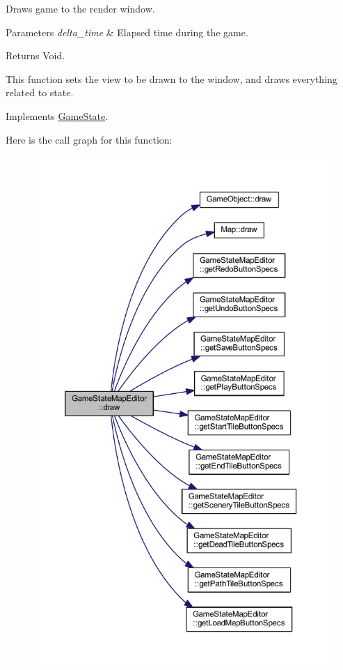 Draws game to the render window. 


\begin{DoxyParams}{Parameters}
{\em delta\+\_\+time} & Elapsed time during the game. \\
\hline
\end{DoxyParams}
\begin{DoxyReturn}{Returns}
Void.
\end{DoxyReturn}
This function sets the view to be drawn to the window, and draws everything related to state. 

Implements \hyperlink{class_game_state_a55a6a68aabdf7054ea0e6ddbf24902df}{Game\+State}.



Here is the call graph for this function\+:
\nopagebreak
\begin{figure}[H]
\begin{center}
\leavevmode
\includegraphics[height=550pt]{class_game_state_map_editor_a37c87643309459ac32d0b5f608bc93b0_cgraph}
\end{center}
\end{figure}


